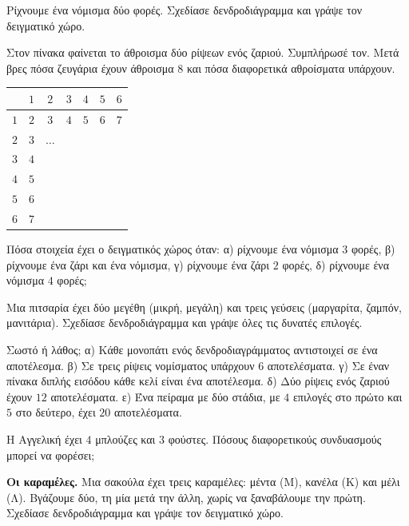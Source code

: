 

\ex Ρίχνουμε ένα νόμισμα δύο φορές. Σχεδίασε δενδροδιάγραμμα και γράψε τον δειγματικό χώρο.

\ex Στον πίνακα φαίνεται το άθροισμα δύο ρίψεων ενός ζαριού. Συμπλήρωσέ τον. Μετά βρες πόσα ζευγάρια έχουν άθροισμα $8$ και πόσα διαφορετικά αθροίσματα υπάρχουν.\par
\begin{center}
\renewcommand{\arraystretch}{1.15}
\begin{tabular}{c|cccccc}
 & $1$ & $2$ & $3$ & $4$ & $5$ & $6$\\\hline
$1$ & $2$ & $3$ & $4$ & $5$ & $6$ & $7$\\
$2$ & $3$ & $\ldots$ & & & & \\
$3$ & $4$ & & & & & \\
$4$ & $5$ & & & & & \\
$5$ & $6$ & & & & & \\
$6$ & $7$ & & & & & \\
\end{tabular}
\end{center}

\ex Πόσα στοιχεία έχει ο δειγματικός χώρος όταν: α) ρίχνουμε ένα νόμισμα $3$ φορές, β) ρίχνουμε ένα ζάρι και ένα νόμισμα, γ) ρίχνουμε ένα ζάρι $2$ φορές, δ) ρίχνουμε ένα νόμισμα $4$ φορές;

\ex Μια πιτσαρία έχει δύο μεγέθη (μικρή, μεγάλη) και τρεις γεύσεις (μαργαρίτα, ζαμπόν, μανιτάρια). Σχεδίασε δενδροδιάγραμμα και γράψε όλες τις δυνατές επιλογές.

\ex Σωστό ή λάθος; α) Κάθε μονοπάτι ενός δενδροδιαγράμματος αντιστοιχεί σε ένα αποτέλεσμα. β) Σε τρεις ρίψεις νομίσματος υπάρχουν $6$ αποτελέσματα. γ) Σε έναν πίνακα διπλής εισόδου κάθε κελί είναι ένα αποτέλεσμα. δ) Δύο ρίψεις ενός ζαριού έχουν $12$ αποτελέσματα. ε) Ένα πείραμα με δύο στάδια, με $4$ επιλογές στο πρώτο και $5$ στο δεύτερο, έχει $20$ αποτελέσματα.

\ex Η Αγγελική έχει $4$ μπλούζες και $3$ φούστες. Πόσους διαφορετικούς συνδυασμούς μπορεί να φορέσει;


\ex \textbf{Οι καραμέλες.} Μια σακούλα έχει τρεις καραμέλες: μέντα (Μ), κανέλα (Κ) και μέλι (Λ). Βγάζουμε δύο, τη μία μετά την άλλη, χωρίς να ξαναβάλουμε την πρώτη. Σχεδίασε δενδροδιάγραμμα και γράψε τον δειγματικό χώρο.

